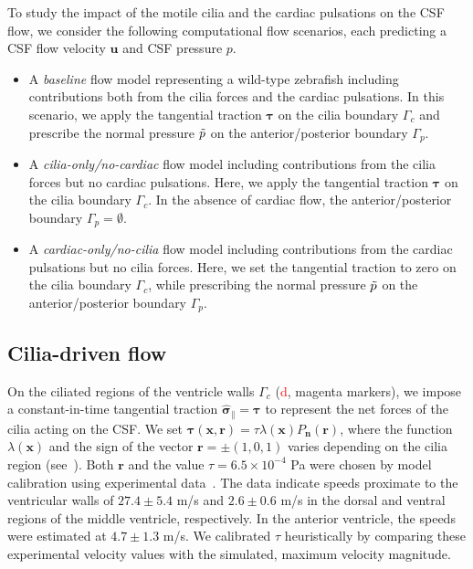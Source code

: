 \documentclass[fleqn]{wlscirep}
\newcommand{\Gc}{\Gamma_{c}}
\newcommand{\Gp}{\Gamma_{p}}
\newcommand{\nn}{\mathbf{n}}
\newcommand{\rr}{\mathbf{r}}
\newcommand{\uu}{\mathbf{u}}
\newcommand{\xx}{\bm{x}}
\newcommand{\bsig}{\bm{\sigma}}
\newcommand{\bsigpar}{\hat{\bsig}_{\parallel}}
\newcommand{\btau}{\bm{\tau}}
\newcommand{\fixme}[1]{\textcolor{red}{#1}}
\begin{document}
To study the impact of the motile cilia and the cardiac pulsations on the CSF flow,
we consider the following computational flow scenarios,
each predicting a CSF flow velocity $\uu$ and CSF pressure $p$.
\begin{itemize}
    \item A \emph{baseline} flow model representing a wild-type zebrafish including 
    contributions both from the cilia forces and the cardiac pulsations.
    In this scenario, we apply the tangential traction $\btau$ on the cilia boundary
    $\Gc$ and prescribe the normal pressure $\Tilde{p}$ on the anterior/posterior boundary $\Gp$. %

    \item A \emph{cilia-only/no-cardiac} flow model including contributions from the
    cilia forces but no cardiac pulsations.
    Here, we apply the tangential traction $\btau$ on the cilia boundary $\Gc$.
    In the absence of cardiac flow, the anterior/posterior boundary $\Gp=\emptyset$. %

    \item A \emph{cardiac-only/no-cilia} flow model including contributions from the
    cardiac pulsations but no cilia forces.
    Here, we set the tangential traction to zero on the cilia boundary
    $\Gc$, while prescribing the normal pressure $\Tilde{p}$ on the
    anterior/posterior boundary $\Gp$.  %
\end{itemize}

\subsection*{Cilia-driven flow}
On the ciliated regions of the ventricle walls $\Gc$ (\fixme{d}, magenta markers),
we impose a constant-in-time tangential traction $\bsigpar=\btau$ to represent the net forces
of the cilia acting on the CSF.
We set $\btau(\xx, \rr) = \tau \lambda(\xx) P_{\nn}(\rr)$, where the function $\lambda(\xx)$
and the sign of the vector $\rr=\pm(1, 0, 1)$ varies depending on the
cilia region (see~).
Both $\rr$ and the value $\tau=6.5\times 10^{-4}$ Pa were chosen by 
model calibration using experimental data~\cite{Olstad2019CiliaryDevelopment}.
The data indicate speeds proximate to the ventricular walls of $27.4 \pm 5.4$ \textmu m/s and
$2.6 \pm 0.6$ \textmu m/s in the dorsal and ventral regions of the middle ventricle, respectively.
In the anterior ventricle, the speeds were estimated at $4.7 \pm 1.3$ \textmu m/s.
We calibrated $\tau$ heuristically by comparing these experimental velocity values
with the simulated, maximum velocity magnitude.
\end{document}
